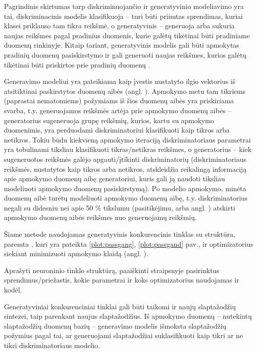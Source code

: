 \documentclass{VUMIFInfBakalaurinis}
\begin{document}
Pagrindinis skirtumas tarp diskriminuojančio ir generatyvinio modeliavimo yra 
tai, diskriminacinis modelis klasifikuoja -- turi būti priimtas sprendimas, 
kuriai klasei priklauso tam tikra reikšmė, o generatyvinis -- generuoja arba 
sukuria naujas reikšmes pagal pradinius duomenis, kurie galėtų tikėtinai būti 
pradiniame duomenų rinkinyje. Kitaip tariant, generatyvinis modelis gali būti 
apmokytas pradinių duomenų pasiskirstymo ir gali generuoti naujas reikšmes, 
kurios galėtų tikėtinai būti priskirtos prie pradinių duomenų \cite{PRaML}.

Generavimo modeliui yra pateikiama kaip įvestis nustatyto ilgio vektorius iš 
atsitiktinai paskirstytos duomenų aibės (angl. ). Apmokymo metu tam tikriems (paprastai nematomiems) požymiams iš 
šios duomenų aibės yra priskiriama svarba, t.y. generuojamos reikšmės artėja 
prie apmokymo duomenų aibės -- generatorius sugeneruoja grupę reikšmių, kurios, 
kartu su apmokymo duomenimis, yra perduodami diskriminatoriui klasifikuoti kaip 
tikros arba netikros. Tokiu būdu kiekvieną apmokymo iteraciją diskriminatoriaus 
parametrai yra tobulinami tiksliau klasifikuoti tikras/netikras reikšmes, o 
generatorius -- kiek sugeneruotos reikšmės galėjo apgauti/įtikinti 
diskriminatorių (diskriminatoriaus reikšmės, nustatytos kaip tikros arba 
netikros, atskleidžia reikalingą informaciją apie apmokymo duomenų aibę 
generatoriui, kuris gali ją naudoti tiksliau modeliuoti apmokymo duomenų 
pasiskirstymą). Po modelio apmokymo, minėta duomenų aibė turėtų modeliuoti 
apmokymo duomenų aibę, t.y. diskriminatorius negali su didesniu nei apie 50 \% 
tikslumu (pasitikėjimu, arba angl. ) atskirti apmokymo 
duomenų aibės reikšmes nuo generuojamų reikšmių.

Šiame metode naudojamas generatyvinis konkurencinis tinklas su struktūra, 
paremta \cite{GAN}, kuri yra pateikta \ref{plot:passgang}, \ref{plot:passgand} 
pav., ir  optimizatorius \cite{ADAM} siekiant minimizuoti 
apmokymo klaidą (angl. ).




Aprašyti neuroninio tinklo struktūrą, paaiškinti straipsnyje pasirinktus 
sprendimus/priežastis, kokie parametrai ir koks optimizatorius naudojamas ir 
kodėl.

Generatyviniai konkurenciniai tinklai gali būti taikomi ir naujų slaptažodžių 
sintezei, taip parenkant naujus slaptažodžius. Iš apmokymo duomenų -- nutekintų 
slaptažodžių duomenų bazių -- generavimo modelis išmoksta slaptažodžių požymius 
pagal tai, ar generuojami slaptažodžiai suklasifikuoti kaip tikri ar ne tikri 
diskriminatoriaus modelio.
\end{document}
